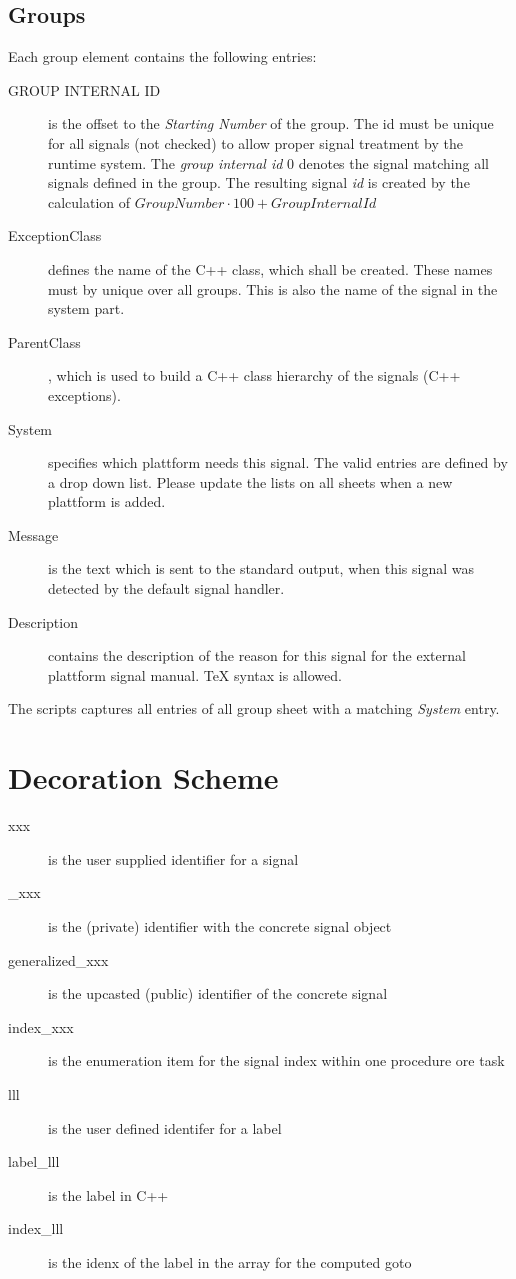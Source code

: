 \subsection{Groups}
Each group element contains the following entries:
\begin{description}
\item[GROUP INTERNAL ID] is the offset to the {\em Starting Number} of the 
   group. The id must be unique for all signals (not checked) to allow
   proper signal treatment by the runtime system.
   The {\em group internal id} 0 denotes the signal matching
   all signals defined in the group.
   The resulting signal {\em id} is created by the calculation of
   $GroupNumber \cdot 100 + GroupInternalId$
 
\item[ExceptionClass] defines the name of the C++ class, which shall be created.
   These names must by unique over all groups. This is also the name of
   the signal in the system part.
\item[ParentClass], which is used to build a C++ class hierarchy of the
    signals (C++ exceptions).
\item[System] specifies which plattform needs this signal. 
   The valid entries are defined by a drop down list. Please update the lists 
   on all sheets when a new plattform is added.
\item[Message] is the text which is sent to the standard output, when this
    signal was detected by the default signal handler.
\item[Description] contains the description of the reason for this signal
   for the external plattform signal manual. TeX syntax is allowed.
\end{description}

The scripts captures all entries of all group sheet with a matching
{\em System} entry.

\section{Decoration Scheme}
\begin{description}
\item[xxx] is the user supplied identifier for a signal
\item[\_xxx] is the (private) identifier with the concrete signal object
\item[generalized\_xxx] is the upcasted (public) identifier 
    of the concrete signal
\item[index\_xxx] is the enumeration item for the signal index within
   one procedure ore task

\item[lll] is the user defined identifer for a label 
\item[label\_lll] is the label in C++
\item[index\_lll] is the idenx of the label in the array for the computed goto

\end{description}

